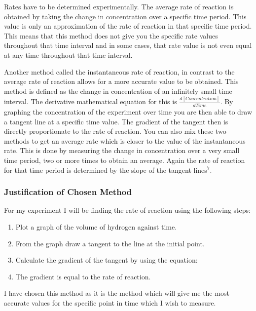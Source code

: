Rates have to be determined experimentally. The average rate of reaction is obtained by taking the change in concentration over a specific time period. This value is only an approximation of the rate of reaction in that specific time period. This means that this method does not give you the specific rate values throughout that time interval and in some cases, that rate value is not even equal at any time throughout that time interval.

Another method called the instantaneous rate of reaction, in contrast to the average rate of reaction allows for a more accurate value to be obtained. This method is defined as the change in concentration of an infinitely small time interval. The derivative mathematical equation for this is $\frac{d[Concentration]}{dTime}$. By graphing the concentration of the experiment over time you are then able to draw a tangent line at a specific time value. The gradient of the tangent then is directly proportionate to the rate of reaction. You can also mix these two methods to get an average rate which is closer to the value of the instantaneous rate. This is done by measuring the change in concentration over a very small time period, two or more times to obtain an average. Again the rate of reaction for that time period is determined by the slope of the tangent lines$^7$.





		\subsubsection{Justification of Chosen Method}

For my experiment I will be finding the rate of reaction using the following steps:

\begin{enumerate}
\item Plot a graph of the volume of hydrogen against time.
\item From the graph draw a tangent to the line at the initial point.
\item Calculate the gradient of the tangent by using the equation: 
\item The gradient is equal to the rate of reaction.
\end{enumerate}

I have chosen this method as it is the method which will give me the most accurate values for the specific point in time which I wish to measure. 






